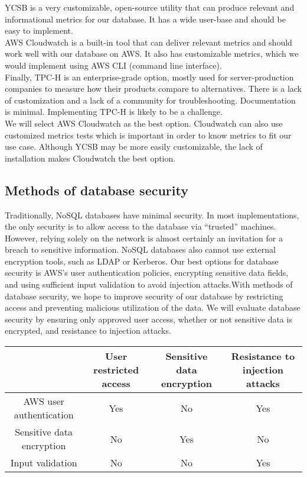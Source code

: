 \documentclass[10pt,draftclsnofoot,onecolumn,journal,compsoc]{IEEEtran}
\begin{document}
        \noindent YCSB is a very customizable, open-source utility that can produce relevant and informational metrics for our database. It has a wide user-base and should be easy to implement. \\
    
        \noindent AWS Cloudwatch is a built-in tool that can deliver relevant metrics and should work well with our database on AWS. It also has customizable metrics, which we would implement using AWS CLI (command line interface).\\ 
        
        \noindent Finally, TPC-H is an enterprise-grade option, mostly used for server-production companies to measure how their products compare to alternatives. There is a lack of customization and a lack of a community for troubleshooting. Documentation is minimal. Implementing TPC-H is likely to be a challenge.\\
        
        \noindent We will select AWS Cloudwatch as the best option. Cloudwatch can also use customized metrics tests which is important in order to know metrics to fit our use case. Although YCSB may be more easily customizable, the lack of installation makes Cloudwatch the best option.
    
        \subsection{Methods of database security}
        Traditionally, NoSQL databases have minimal security. In most implementations, the only security is to allow access to the database via “trusted” machines. However, relying solely on the network is almost certainly an invitation for a breach to sensitive information. NoSQL databases also cannot use external encryption tools, such as LDAP or Kerberos. Our best options for database security is AWS’s user authentication policies, encrypting sensitive data fields, and using sufficient input validation to avoid injection attacks.With methods of database security, we hope to improve security of our database by restricting access and preventing malicious utilization of the data. We will evaluate database security by ensuring only approved user access, whether or not sensitive data is encrypted, and resistance to injection attacks.
        
        \begin{table}[ht]
        \centering
        \begin{tabular}{|c|c|c|c|}
            \hline
            \textbf{} & \textbf{User restricted access} & \textbf{Sensitive data encryption} & \textbf{Resistance to injection attacks}\\
            \hline
            AWS user authentication & Yes & No & Yes\\
            \hline
            Sensitive data encryption & No & Yes & No\\
            \hline
            Input validation & No & No & Yes\\
            \hline
        \end{tabular}
        \end{table}
\end{document}
